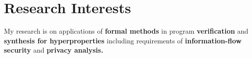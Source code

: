 

\section{Research Interests}

My research is on applications of {\bf formal methods} in program {\bf verification} and 
{\bf synthesis for hyperproperties} including requirements of {\bf information-flow security} and {\bf privacy analysis.}\\

